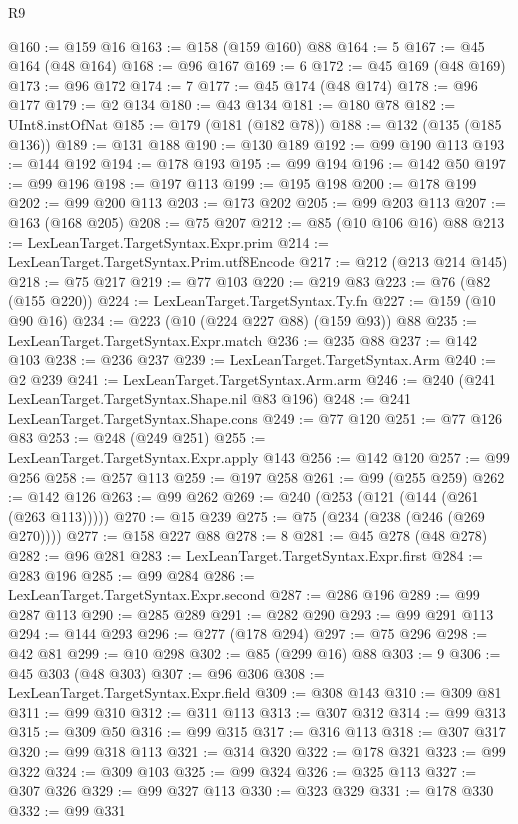 \begin{lexlean}{R9}
\begin{coremodule}
@160 := @159 @16
@163 := @158 (@159 @160) @88
@164 := 5
@167 := @45 @164 (@48 @164)
@168 := @96 @167
@169 := 6
@172 := @45 @169 (@48 @169)
@173 := @96 @172
@174 := 7
@177 := @45 @174 (@48 @174)
@178 := @96 @177
@179 := @2 @134
@180 := @43 @134
@181 := @180 @78
@182 := UInt8.instOfNat
@185 := @179 (@181 (@182 @78))
@188 := @132 (@135 (@185 @136))
@189 := @131 @188
@190 := @130 @189
@192 := @99 @190 @113
@193 := @144 @192
@194 := @178 @193
@195 := @99 @194
@196 := @142 @50
@197 := @99 @196
@198 := @197 @113
@199 := @195 @198
@200 := @178 @199
@202 := @99 @200 @113
@203 := @173 @202
@205 := @99 @203 @113
@207 := @163 (@168 @205)
@208 := @75 @207
@212 := @85 (@10 @106 @16) @88
@213 := LexLeanTarget.TargetSyntax.Expr.prim
@214 := LexLeanTarget.TargetSyntax.Prim.utf8Encode
@217 := @212 (@213 @214 @145)
@218 := @75 @217
@219 := @77 @103
@220 := @219 @83
@223 := @76 (@82 (@155 @220))
@224 := LexLeanTarget.TargetSyntax.Ty.fn
@227 := @159 (@10 @90 @16)
@234 := @223 (@10 (@224 @227 @88) (@159 @93)) @88
@235 := LexLeanTarget.TargetSyntax.Expr.match
@236 := @235 @88
@237 := @142 @103
@238 := @236 @237
@239 := LexLeanTarget.TargetSyntax.Arm
@240 := @2 @239
@241 := LexLeanTarget.TargetSyntax.Arm.arm
@246 := @240 (@241 LexLeanTarget.TargetSyntax.Shape.nil @83 @196)
@248 := @241 LexLeanTarget.TargetSyntax.Shape.cons
@249 := @77 @120
@251 := @77 @126 @83
@253 := @248 (@249 @251)
@255 := LexLeanTarget.TargetSyntax.Expr.apply @143
@256 := @142 @120
@257 := @99 @256
@258 := @257 @113
@259 := @197 @258
@261 := @99 (@255 @259)
@262 := @142 @126
@263 := @99 @262
@269 := @240 (@253 (@121 (@144 (@261 (@263 @113)))))
@270 := @15 @239
@275 := @75 (@234 (@238 (@246 (@269 @270))))
@277 := @158 @227 @88
@278 := 8
@281 := @45 @278 (@48 @278)
@282 := @96 @281
@283 := LexLeanTarget.TargetSyntax.Expr.first
@284 := @283 @196
@285 := @99 @284
@286 := LexLeanTarget.TargetSyntax.Expr.second
@287 := @286 @196
@289 := @99 @287 @113
@290 := @285 @289
@291 := @282 @290
@293 := @99 @291 @113
@294 := @144 @293
@296 := @277 (@178 @294)
@297 := @75 @296
@298 := @42 @81
@299 := @10 @298
@302 := @85 (@299 @16) @88
@303 := 9
@306 := @45 @303 (@48 @303)
@307 := @96 @306
@308 := LexLeanTarget.TargetSyntax.Expr.field
@309 := @308 @143
@310 := @309 @81
@311 := @99 @310
@312 := @311 @113
@313 := @307 @312
@314 := @99 @313
@315 := @309 @50
@316 := @99 @315
@317 := @316 @113
@318 := @307 @317
@320 := @99 @318 @113
@321 := @314 @320
@322 := @178 @321
@323 := @99 @322
@324 := @309 @103
@325 := @99 @324
@326 := @325 @113
@327 := @307 @326
@329 := @99 @327 @113
@330 := @323 @329
@331 := @178 @330
@332 := @99 @331

\end{coremodule}
\end{lexlean}
